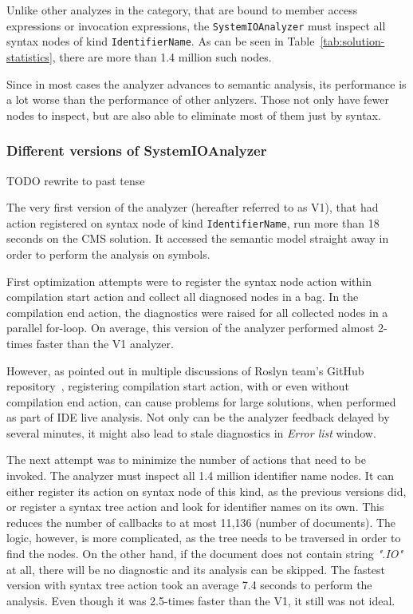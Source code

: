 \documentclass[
  digital, %
  table,   %
  lof,     %
  lot,     %
  oneside,
]{fithesis3}
\begin{document}
Unlike other analyzes in the category, that are bound to member access expressions or invocation expressions, the \texttt{SystemIOAnalyzer} must inspect all syntax nodes of kind \texttt{IdentifierName}. As can be seen in Table~\ref{tab:solution-statistics}, there are more than 1.4 million such nodes. 

Since in most cases the analyzer advances to semantic analysis, its performance is a lot worse than the performance of other anlyzers. Those not only have fewer nodes to inspect, but are also able to eliminate most of them just by syntax.

\subsubsection{\textbf{Different versions of SystemIOAnalyzer}}
TODO rewrite to past tense

The very first version of the analyzer (hereafter referred to as V1), that had action registered on syntax node of kind \texttt{IdentifierName}, run more than 18 seconds on the CMS solution. It accessed the semantic model straight away in order to perform the analysis on symbols.

First optimization attempts were to register the syntax node action within compilation start action and collect all diagnosed nodes in a bag. In the compilation end action, the diagnostics were raised for all collected nodes in a parallel for-loop. On average, this version of the analyzer performed almost 2-times faster than the V1 analyzer.

However, as pointed out in multiple discussions of Roslyn team's GitHub repository~\cite{compilation-end-action-1, compilation-end-action-2}, registering compilation start action, with or even without compilation end action, can cause problems for large solutions, when performed as part of IDE live analysis. Not only can be the analyzer feedback delayed by several minutes, it might also lead to stale diagnostics in \textit{Error list} window.

The next attempt was to minimize the number of actions that need to be invoked. The analyzer must inspect all 1.4 million identifier name nodes. It can either register its action on syntax node of this kind, as the previous versions did, or register a syntax tree action and look for identifier names on its own. This reduces the number of callbacks to at most 11,136 (number of documents). The logic, however, is more complicated, as the tree needs to be traversed in order to find the nodes. 
On the other hand, if the document does not contain string \textit{".IO"} at all, there will be no diagnostic and its analysis can be skipped. The fastest version with syntax tree action took an average 7.4 seconds to perform the analysis. Even though it was 2.5-times faster than the V1, it still was not ideal.
\end{document}
